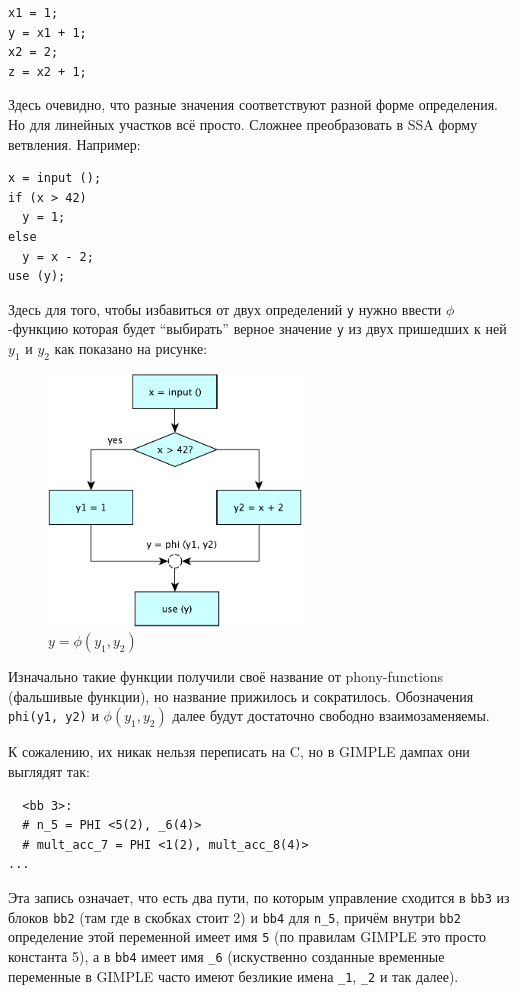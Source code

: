 \documentclass[a4paper,12pt,oneside]{article}
\begin{document}
\begin{lstlisting}
x1 = 1;
y = x1 + 1;
x2 = 2;
z = x2 + 1;
\end{lstlisting}

Здесь очевидно, что разные значения соответствуют разной форме определения. Но для линейных участков всё просто. Сложнее преобразовать в SSA форму ветвления. Например:

\begin{lstlisting}
x = input ();
if (x > 42)
  y = 1;
else
  y = x - 2;
use (y);
\end{lstlisting}

Здесь для того, чтобы избавиться от двух определений \lstinline!y! нужно ввести $\phi$-функцию которая будет ``выбирать'' верное значение \lstinline!y! из двух пришедших к ней $y_1$ и $y_2$ как показано на рисунке:

\begin{figure}[h!]
\centering
\includegraphics[width=0.6\textwidth]{illustrations/ssa-romb-crop.pdf}
\caption{$y = \phi(y_1, y_2)$}
\label{fig:ssa_romb_scheme}
\end{figure}

Изначально такие функции получили своё название от phony-functions (фальшивые функции), но название прижилось и сократилось. Обозначения \lstinline!phi(y1, y2)! и $\phi(y_1, y_2)$ далее будут достаточно свободно взаимозаменяемы.

К сожалению, их никак нельзя переписать на C, но в GIMPLE дампах они выглядят так:

\begin{lstlisting}
  <bb 3>:
  # n_5 = PHI <5(2), _6(4)>
  # mult_acc_7 = PHI <1(2), mult_acc_8(4)>
...
\end{lstlisting}

Эта запись означает, что есть два пути, по которым управление сходится в \lstinline!bb3! из блоков \lstinline!bb2! (там где в скобках стоит 2) и \lstinline!bb4! для \lstinline!n_5!, причём внутри \lstinline!bb2! определение этой переменной имеет имя \lstinline!5! (по правилам GIMPLE это просто константа 5), а в \lstinline!bb4! имеет имя \lstinline!_6! (искуственно созданные временные переменные в GIMPLE часто имеют безликие имена \lstinline!_1!, \lstinline!_2! и так далее).
\end{document}
